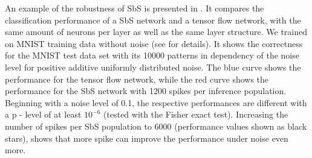 An example of the robustness of SbS is presented in
. It compares the classification performance of
a SbS network and a tensor flow network, with the same amount of
neurons per layer as well as the same layer structure. We trained on MNIST training data without noise (see \cite{rotermund2019Backpropagation} for details). It shows the correctness for the MNIST test data set with its 10000 patterns in dependency of the noise level for positive additive
uniformly distributed noise. The blue curve shows the performance for
the tensor flow network, while the red curve shows the performance for
the SbS network with 1200 spikes per inference population. Beginning
with a noise level of 0.1, the respective performances are different
with a p - level of at least $10^{-6}$ (tested with the Fisher exact
test). Increasing the number of spikes per SbS population to 6000
(performance values shown as black stars), shows that more spike can
improve the performance under noise even more. 
